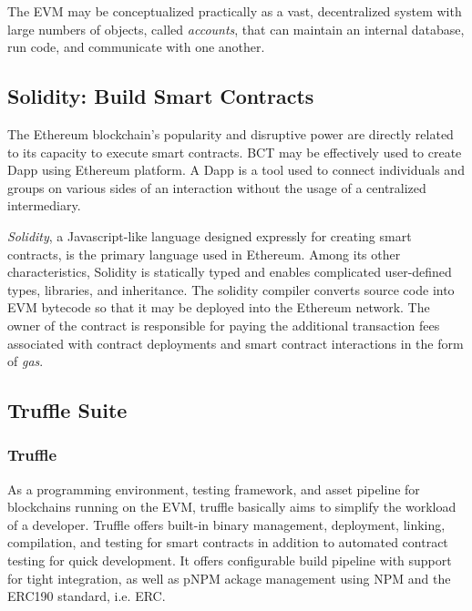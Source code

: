 \vspace{.5cm}

The \ac{EVM} may be conceptualized practically as a vast, decentralized system with large numbers of objects, called \textit{accounts}, that can maintain an internal database, run code, and communicate with one another.

\subsection{Solidity: Build Smart Contracts}

The Ethereum blockchain's popularity and disruptive power are directly related to its capacity to execute smart contracts. \ac{BCT} may be effectively used to create \ac{Dapp} using Ethereum platform. A \ac{Dapp} is a tool used to connect individuals and groups on various sides of an interaction without the usage of a centralized intermediary.

\vspace{.5cm}

\textit{Solidity}, a Javascript-like language designed expressly for creating smart contracts, is the primary language used in Ethereum. Among its other characteristics, Solidity is statically typed and enables complicated user-defined types, libraries, and inheritance. The solidity compiler converts source code into \ac{EVM} bytecode so that it may be deployed into the Ethereum network. The owner of the contract is responsible for paying the additional transaction fees associated with contract deployments and smart contract interactions in the form of \textit{gas}.

\subsection{Truffle Suite}
\subsubsection{Truffle}

As a programming environment, testing framework, and asset pipeline for blockchains running on the \ac{EVM}, truffle basically aims to simplify the workload of a developer. Truffle offers built-in binary management, deployment, linking, compilation, and testing for smart contracts in addition to automated contract testing for quick development. It offers configurable build pipeline with support for tight integration, as well as pNPM ackage management using \ac{NPM} and the ERC190 standard, i.e. \ac{ERC}.

